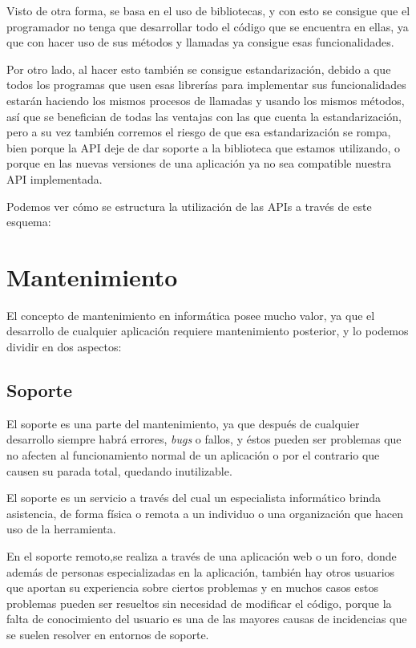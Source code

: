 Visto de otra forma, se basa en el uso de bibliotecas, y con esto se consigue que el programador no tenga que desarrollar todo el código que se encuentra en ellas, ya que con hacer uso de sus métodos y llamadas ya consigue esas funcionalidades.

Por otro lado, al hacer esto también se consigue estandarización, debido a que todos los programas que usen esas librerías para implementar sus funcionalidades estarán haciendo los mismos procesos de llamadas y usando los mismos métodos, así que se benefician de todas las ventajas con las que cuenta la estandarización, pero a su vez también corremos el riesgo de que esa estandarización se rompa, bien porque la API deje de dar soporte a la biblioteca que estamos utilizando, o porque en las nuevas versiones de una aplicación ya no sea compatible nuestra API implementada. 

Podemos ver cómo se estructura la utilización de las APIs a través de este esquema:



\section{Mantenimiento}

El concepto de mantenimiento en informática posee mucho valor, ya que el desarrollo de cualquier aplicación requiere mantenimiento posterior, y lo podemos dividir en dos aspectos:

\subsection{Soporte}

El soporte \cite{sup1} \cite{sup2} es una parte del mantenimiento, ya que después de cualquier desarrollo siempre habrá errores, \textit{bugs} o fallos, y éstos pueden ser problemas que no afecten al funcionamiento normal de un aplicación o por el contrario que causen su parada total, quedando inutilizable. 

El soporte es un servicio a través del cual un especialista informático brinda asistencia, de forma física o remota a un individuo o una organización que hacen uso de la herramienta. 

En el soporte remoto,se realiza a través de una aplicación web o un foro, donde además de personas especializadas en la aplicación, también hay otros usuarios que aportan su experiencia sobre ciertos problemas y en muchos casos estos problemas pueden ser resueltos sin necesidad de modificar el código, porque la falta de conocimiento del usuario es una de las mayores causas de incidencias que se suelen resolver en entornos de soporte.

